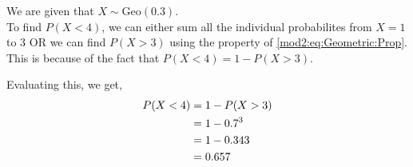 \begin{subquestions}

\subquestion

We are given that $X \sim \text{Geo} (0.3)$. \\
To find $P(X<4)$, we can either sum all the individual probabilites from $X=1$ to $3$ OR we can find $P(X>3)$ using the property of \ref{mod2:eq:Geometric:Prop}. This is because of the fact that $P(X<4)=1-P(X>3)$.

Evaluating this, we get,
\begin{align}
	P(X<4) &= 1-P(X>3) \nonumber \\
	&=1-0.7^3 \nonumber \\
	&=1-0.343 \nonumber \\
	&=0.657 \\ \nonumber		
\end{align}


\end{subquestions}
